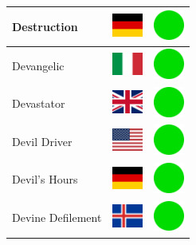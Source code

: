 \documentclass[12pt, a4paper, twoside]{report}
\begin{document}
\begin{center}
\begin{longtable}{|p{5cm}|p{2cm}|p{2cm}|}
 Destruction                                                & \includegraphics[width=1cm]{../img/flags/de} &   \includegraphics[width=1cm]{../likes/y} \\ \hline
 Devangelic                                                 & \includegraphics[width=1cm]{../img/flags/it} &   \includegraphics[width=1cm]{../likes/y} \\ \hline
 Devastator                                                 & \includegraphics[width=1cm]{../img/flags/gb} &   \includegraphics[width=1cm]{../likes/y} \\ \hline
 Devil Driver                                               & \includegraphics[width=1cm]{../img/flags/us} &   \includegraphics[width=1cm]{../likes/y} \\ \hline
 Devil's Hours                                              & \includegraphics[width=1cm]{../img/flags/de} &   \includegraphics[width=1cm]{../likes/y} \\ \hline
 Devine Defilement                                          & \includegraphics[width=1cm]{../img/flags/is} &   \includegraphics[width=1cm]{../likes/y} \\ \hline

\end{longtable}
\end{center}
\end{document}

